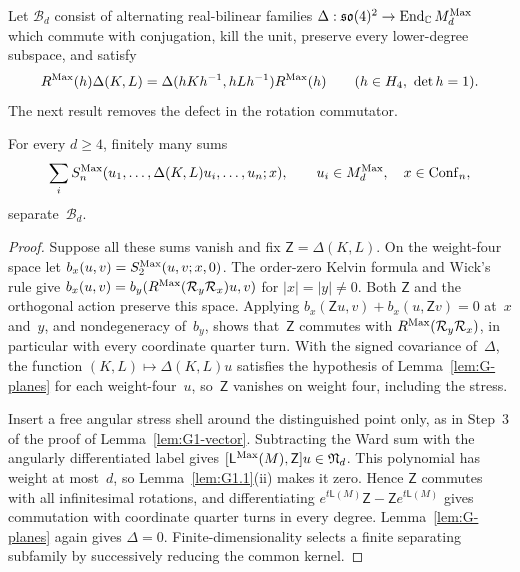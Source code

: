 Let $\mathcal B_d$ consist of alternating real-bilinear families $\Delta:\mathfrak{so}(4)^2\to\operatorname{End}_{\mathbb{C}}M_{d}^{\mathrm{Max}}$ which commute with conjugation, kill the unit, preserve every lower-degree subspace, and satisfy
\begin{equation*}
R^{\rm Max}(h)\Delta(K,L)=\Delta(hKh^{-1},hLh^{-1})R^{\rm Max}(h)
\qquad(h\in H_4,\ \det h=1).
\end{equation*}
The next result removes the defect in the rotation commutator.
\begin{lemma}\label{lem:G1-internal}
For every $d\ge4$, finitely many sums
\begin{equation}\label{eq:G-erasure-test}
\sum_i S_n^{\rm Max}(u_1,\ldots,\Delta(K,L)u_i,\ldots,u_n;x),
\qquad u_i\in M_{d}^{\mathrm{Max}},\quad x\in\mathrm{Conf}_{n},
\end{equation}
separate~$\mathcal B_d$.
\end{lemma}
\begin{proof}
Suppose all these sums vanish and fix $\mathsf Z=\Delta(K,L)$. On the weight-four space let $b_x(u,v)=S_2^{\rm Max}(u,v;x,0)$. The order-zero Kelvin formula and Wick's rule give $b_x(u,v)=b_y(R^{\rm Max}(\mathcal R_y\mathcal R_x)u,v)$ for $|x|=|y|\ne0$. Both $\mathsf Z$ and the orthogonal action preserve this space. Applying $b_x(\mathsf Zu,v)+b_x(u,\mathsf Zv)=0$ at~$x$ and~$y$, and nondegeneracy of~$b_y$, shows that~$\mathsf Z$ commutes with $R^{\rm Max}(\mathcal R_y\mathcal R_x)$, in particular with every coordinate quarter turn. With the signed covariance of~$\Delta$, the function $(K,L)\mapsto\Delta(K,L)u$ satisfies the hypothesis of Lemma~\ref{lem:G-planes} for each weight-four~$u$, so~$\mathsf Z$ vanishes on weight four, including the stress.

Insert a free angular stress shell around the distinguished point only, as in Step~3 of the proof of Lemma~\ref{lem:G1-vector}. Subtracting the Ward sum with the angularly differentiated label gives $[\mathsf L^{\rm Max}(M),\mathsf Z]u\in\mathfrak N_d$. This polynomial has weight at most~$d$, so Lemma~\ref{lem:G1.1}(ii) makes it zero. Hence $\mathsf Z$ commutes with all infinitesimal rotations, and differentiating $e^{t\mathsf L(M)}\mathsf Z-\mathsf Ze^{t\mathsf L(M)}$ gives commutation with coordinate quarter turns in every degree. Lemma~\ref{lem:G-planes} again gives $\Delta=0$. Finite-dimensionality selects a finite separating subfamily by successively reducing the common kernel.
\end{proof}

